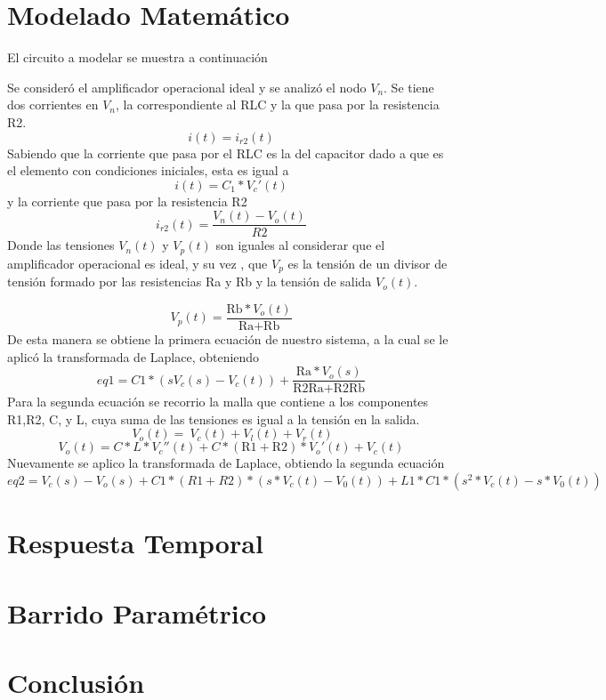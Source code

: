 \documentclass[10pt,a4paper]{article} %
\begin{document}
\section{Modelado Matemático}
El circuito a modelar se muestra a continuación %
\begin{center}
\end{center} 
Se consideró el amplificador operacional ideal y se analizó el nodo $V_{n}$.
Se tiene dos corrientes en $V_{n}$, la correspondiente al RLC y la que pasa por la resistencia R2. \\
\begin{equation}
i(t)=i_{r2}(t)
\end{equation}
Sabiendo que la corriente que pasa por el RLC es la del capacitor dado a que es el elemento con condiciones iniciales, esta es igual a 
\begin{equation}
i(t)=C_{1}*V_{c}'(t)
\end{equation}
y la corriente que pasa por la resistencia R2 
\begin{equation}
i_{r2}(t)=\frac{V_{n}(t)-V_{o}(t)}{R2}
\end{equation}
Donde las tensiones $V_{n}(t)$ y $V_{p}(t)$ son iguales al considerar que el amplificador operacional es ideal, y su vez , que  $V_{p}$ es la tensión de un divisor de tensión formado por las resistencias Ra y Rb y la tensión de salida  $V_{o}(t)$. 

\begin{equation}
V_{p}(t)=\frac{\text{Rb}* V_{o}(t)}{\text{Ra}+\text{Rb}}
\end{equation}
De esta manera se obtiene la primera ecuación de nuestro sistema, a la cual se le aplicó la transformada de Laplace, obteniendo 
\begin{equation}
eq1=C{1}* (s V_{c}(s)-V_{c}(t))+\frac{\text{Ra}* V_{o}(s)}{\text{R2} \text{Ra}+\text{R2} \text{Rb}}
\end{equation}
Para la segunda ecuación se recorrio la malla que contiene a los componentes R1,R2, C, y L, cuya suma de las tensiones es igual a la tensión en la salida. 
\begin{equation}
\ V_{o}(t)=\ V_{c}(t)+ V_{l}(t)+ V_{r}(t)
\end{equation}
\begin{equation}
V_{o}(t)=C*L*V_{c}''(t)+ C*(\text{R1}+\text{R2})*V_{o}'(t)+V_{c}(t)
\end{equation}
Nuevamente se aplico la transformada de Laplace, obtiendo la segunda ecuación
\begin{equation}
eq2 = V_{c}(s) - V_{o}(s) + C1*(R1 + R2)*(s*V_{c}(t) - V_{0}(t)) + 
L1*C1*(s^{2}*V_{c}(t) - s*V_{0}(t))
\end{equation}
\section{Respuesta Temporal}
\section{Barrido Paramétrico}
\section{Conclusión}
\end{document}
